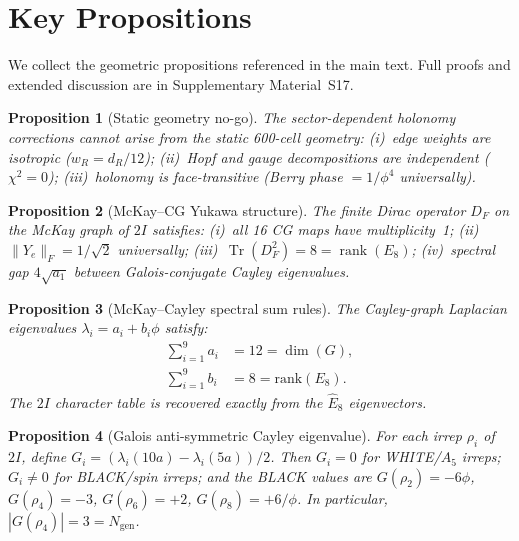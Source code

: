 \documentclass[12pt,a4paper]{article}
\newtheorem{proposition}{Proposition}
\theoremstyle{definition}
\begin{document}
\appendix
\section{Key Propositions}
\label{app:propositions}

We collect the geometric propositions referenced in the main text.  Full proofs and extended discussion are in Supplementary Material~S17.

\begin{proposition}[Static geometry no-go]\label{prop:nogo}
The sector-dependent holonomy corrections cannot arise from the static 600-cell geometry: (i)~edge weights are isotropic ($w_R = d_R/12$); (ii)~Hopf and gauge decompositions are independent ($\chi^2 = 0$); (iii)~holonomy is face-transitive (Berry phase $= 1/\phi^4$ universally).
\end{proposition}

\begin{proposition}[McKay--CG Yukawa structure]\label{prop:mckay_df}
The finite Dirac operator $D_F$ on the McKay graph of $2I$ satisfies:
(i)~all 16 CG maps have multiplicity~1;
(ii)~$\|Y_e\|_F = 1/\sqrt{2}$ universally;
(iii)~$\operatorname{Tr}(D_F^2) = 8 = \operatorname{rank}(E_8)$;
(iv)~spectral gap $4\sqrt{a_1}$ between Galois-conjugate Cayley eigenvalues.
\end{proposition}

\begin{proposition}[McKay--Cayley spectral sum rules]\label{prop:mckay_sumrules}
The Cayley-graph Laplacian eigenvalues $\lambda_i = a_i + b_i\phi$ satisfy:
\begin{align}
\sum_{i=1}^{9} a_i &= 12 = \dim(G), \label{eq:sumrule_a} \\
\sum_{i=1}^{9} b_i &= 8 = \mathrm{rank}(E_8). \label{eq:sumrule_b}
\end{align}
The $2I$ character table is recovered exactly from the $\hat{E}_8$ eigenvectors.
\end{proposition}

\begin{proposition}[Galois anti-symmetric Cayley eigenvalue]\label{prop:galois_antisym}
For each irrep $\rho_i$ of $2I$, define $G_i = (\lambda_i(10a) - \lambda_i(5a))/2$.  Then $G_i = 0$ for WHITE/$A_5$ irreps; $G_i \neq 0$ for BLACK/spin irreps; and the BLACK values are
$G(\rho_2) = -6\phi$, $G(\rho_4) = -3$, $G(\rho_6) = +2$, $G(\rho_8) = +6/\phi$.
In particular, $|G(\rho_4)| = 3 = N_{\text{gen}}$.
\label{eq:galois_antisym}
\end{proposition}
\end{document}
